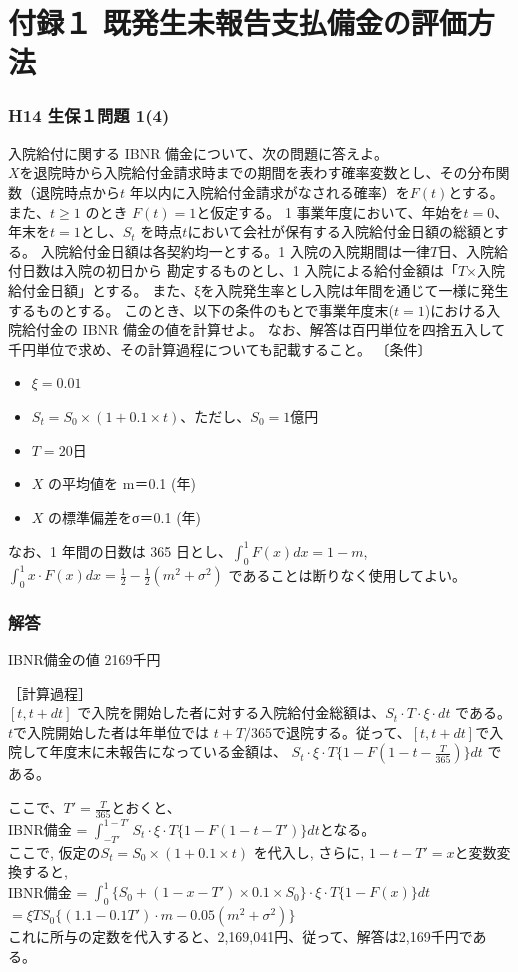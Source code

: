 \documentclass[report,gutter=10mm,fore-edge=10mm,uplatex,dvipdfmx]{jlreq}
\begin{document}
\section{付録１ 既発生未報告支払備金の評価方法}
\subsubsection{H14 生保１問題 1(4)}
入院給付に関する IBNR 備金について、次の問題に答えよ。\\
$X$を退院時から入院給付金請求時までの期間を表わす確率変数とし、その分布関数（退院時点から$t$
年以内に入院給付金請求がなされる確率）を$F(t)$とする。また、$t\geq 1$ のとき
$F(t)=1$と仮定する。
1 事業年度において、年始を$t=0$、年末を$t=1$とし、$S_t$ を時点$t$において会社が保有する入院給付金日額の総額とする。
入院給付金日額は各契約均一とする。1 入院の入院期間は一律$T$日、入院給付日数は入院の初日から
勘定するものとし、1 入院による給付金額は「$T$×入院給付金日額」とする。
また、ξを入院発生率とし入院は年間を通じて一様に発生するものとする。
このとき、以下の条件のもとで事業年度末($t=1$)における入院給付金の IBNR 備金の値を計算せよ。
なお、解答は百円単位を四捨五入して千円単位で求め、その計算過程についても記載すること。
〔条件〕
\begin{itemize}
 \item $\xi=0.01$
 \item $S_t=S_0\times(1+0.1\times t)$、ただし、$S_0=1$億円
 \item $T=20$日
 \item $X$ の平均値を m＝0.1 (年)
 \item $X$ の標準偏差をσ＝0.1 (年)
\end{itemize}
なお、1 年間の日数は 365 日とし、$\int_{0}^{1}F(x)dx = 1-m$, $\int_{0}^{1}x\cdot F(x)dx = \frac{1}{2}-\frac{1}{2}(m^2+\sigma^2)$
であることは断りなく使用してよい。
\subsubsection{解答}
IBNR備金の値 2169千円

［計算過程］\\
$[t, t+dt]$
で入院を開始した者に対する入院給付金総額は、$S_t\cdot T\cdot\xi\cdot dt$
である。
$t$で入院開始した者は年単位では
$t+T/365$で退院する。従って、$[t,t+dt]$で入院して年度末に未報告になっている金額は、
$S_t\cdot\xi\cdot T\{1-F(1-t-\frac{T}{365})\}dt$ である。

ここで、$T'=\frac{T}{365}$とおくと、\\
IBNR備金 = $\int_{-T'}^{1-T'}S_t\cdot\xi\cdot T\{1-F(1-t-T')\}dt$となる。\\
ここで, 仮定の$S_t=S_0\times(1+0.1\times t)$
を代入し, さらに,  $1-t-T'=x$と変数変換すると,\\
IBNR備金 = $\int_{0}^{1}\{S_0+(1-x-T')\times 0.1\times S_0\}\cdot\xi\cdot T\{1-F(x)\}dt$\\
$=\xi TS_0\{(1.1-0.1T')\cdot m-0.05(m^2+\sigma^2)\}$\\
これに所与の定数を代入すると、2,169,041円、従って、解答は2,169千円である。
\end{document}
